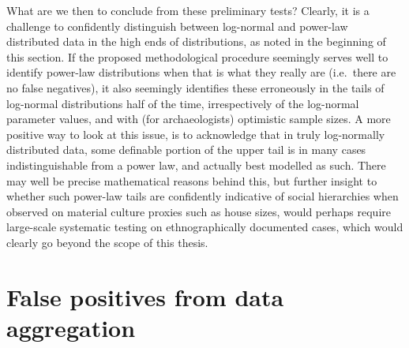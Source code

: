 \documentclass[
  12pt,
  a4paper, twoside]{book}
\begin{document}
What are we then to conclude from these preliminary tests? Clearly, it is a challenge to confidently distinguish between log-normal and power-law distributed data in the high ends of distributions, as noted in the beginning of this section. If the proposed methodological procedure seemingly serves well to identify power-law distributions when that is what they really are (i.e.~there are no false negatives), it also seemingly identifies these erroneously in the tails of log-normal distributions half of the time, irrespectively of the log-normal parameter values, and with (for archaeologists) optimistic sample sizes. A more positive way to look at this issue, is to acknowledge that in truly log-normally distributed data, some definable portion of the upper tail is in many cases indistinguishable from a power law, and actually best modelled as such. There may well be precise mathematical reasons behind this, but further insight to whether such power-law tails are confidently indicative of social hierarchies when observed on material culture proxies such as house sizes, would perhaps require large-scale systematic testing on ethnographically documented cases, which would clearly go beyond the scope of this thesis.

\FloatBarrier

\hypertarget{false-positives-from-data-aggregation}{%
\section{False positives from data aggregation}\label{false-positives-from-data-aggregation}}
\end{document}
